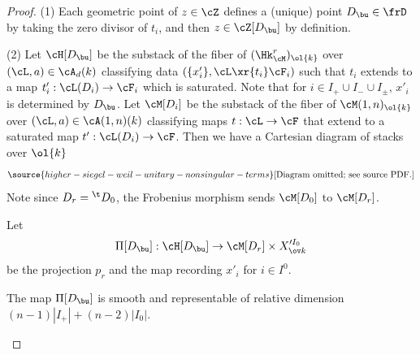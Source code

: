 \begin{proof}
(1) Each geometric point of $z\in \cZ$ defines a (unique) point $D_{\bu}\in \frD$ by taking the zero divisor of $t_{i}$, and then $z\in \cZ[D_{\bu}]$ by definition.

(2) Let $\cH[D_{\bu}]$ be the substack of the fiber of $(\Hk^{r}_{\cM})_{\ol{k}}$ over $(\cL,a)\in \cA_{d}(k)$ classifying data $(\{x'_{i}\},\cL\xr{t_{i}}\cF_{i})$ such that $t_{i}$ extends to a map $t'_{i}: \cL(D_{i})\to \cF_{i}$ which is saturated. Note that  for $i\in I_{+}\cup I_{-}\cup I_{\pm}$, $x'_{i}$ is determined by $D_{\bu}$. Let $\cM[D_{i}]$ be the substack of the fiber of $\cM(1,n)_{\ol{k}}$ over $(\cL,a)\in \cA(1,n)(k)$ classifying maps $t:\cL\to \cF$ that extend to a saturated map $t': \cL(D_{i})\to \cF$. Then we have a Cartesian diagram of stacks over $\ol{k}$
\begin{equation}\label{ZHM}
\source{higher-siegel-weil-unitary-nonsingular-terms}
\text{[Diagram omitted; see source PDF.]}
\end{equation}
Note since $D_{r}={}^{\t}D_{0}$, the Frobenius morphism sends $\cM[D_{0}]$ to $\cM[D_{r}]$.

Let
\begin{equation}
\Pi[D_{\bu}]: \cH[D_{\bu}]\to \cM[D_{r}]\times X'^{I_{0}}_{\ov k}
\end{equation}
be the projection $p_{r}$ and the map recording $x'_{i}$ for $i\in I^{0}$.

\begin{claim}
\notready The map $\Pi[D_{\bu}]$ is smooth and representable of relative dimension $(n-1)|I_{+}|+(n-2)|I_{0}|$.
\end{claim}


\end{proof}
